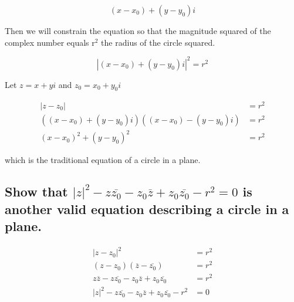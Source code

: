 \documentclass[11pt]{article}
\begin{document}
\[ (x - x_0) + (y - y_0)i \]

Then we will constrain the equation so that the magnitude squared of the complex number equals r\(^{\text{2}}\) the radius of the circle squared.

\[ |(x - x_0) + (y - y_0)i|^2 = r^2 \]

Let \(z = x+yi\) and \(z_0 = x_0 + y_0i\)

\begin{align*}
  |z - z_0| &= r^2 \\
  ((x-x_0) + (y - y_0)i)((x-x_0) - (y-y_0)i) &= r^2 \\
  (x-x_0)^2 + (y-y_0)^2 &= r^2
\end{align*}

which is the traditional equation of a circle in a plane.

\subsection*{Show that \(|z|^2 - z\overline{z_0} - z_0\overline{z} + z_0\overline{z_0} - r^2 = 0\) is another valid equation describing a circle in a plane.}
\label{sec:orgb9e9fc7}

\begin{align*}
  |z - z_0|^2 &= r^2 \\
  (z - z_0)(\overline{z} - \overline{z_0}) &= r^2 \\
  z \overline{z} - z\overline{z_0} - z_0\overline{z} + z_0\overline{z_0} &= r^2 \\
  |z|^2 - z\overline{z_0} - z_0\overline{z} + z_0\overline{z_0} - r^2 &= 0
\end{align*}
\end{document}
